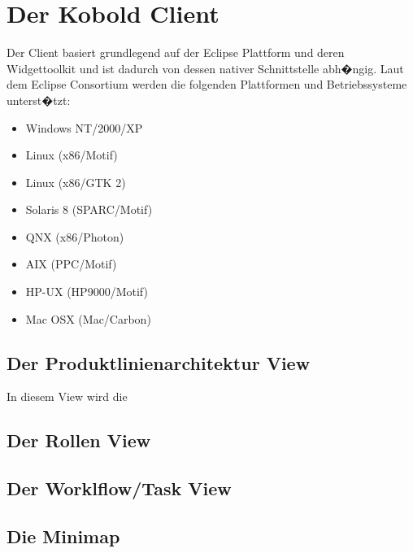 \chapter{Der Kobold Client}
Der Client basiert grundlegend auf der Eclipse Plattform und deren Widgettoolkit und ist
dadurch von dessen nativer Schnittstelle abh�ngig. Laut dem Eclipse Consortium werden die folgenden 
Plattformen und Betriebssysteme unterst�tzt:
\begin{itemize}
    \item Windows NT/2000/XP
    \item Linux (x86/Motif)
    \item Linux (x86/GTK 2)
    \item Solaris 8 (SPARC/Motif)
    \item QNX (x86/Photon)
    \item AIX (PPC/Motif) 
    \item HP-UX (HP9000/Motif)
    \item Mac OSX (Mac/Carbon)
\end{itemize}
\section{Der Produktlinienarchitektur View}
In diesem View wird die 
\section{Der Rollen View}
\section{Der Worklflow/Task View}
\section{Die Minimap}